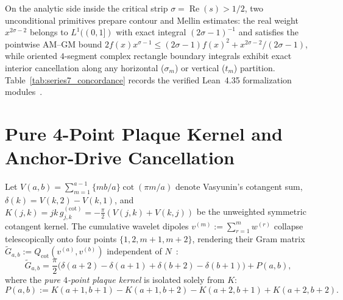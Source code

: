 \documentclass[10pt,a4paper]{article}
\theoremstyle{definition}
\begin{document}
On the analytic side inside the critical strip $\sigma = \operatorname{Re}(s) > 1/2$, two unconditional primitives prepare contour and Mellin estimates: the real weight $x^{2\sigma-2}$ belongs to $L^1((0,1])$ with exact integral $(2\sigma-1)^{-1}$ and satisfies the pointwise AM--GM bound $2 f(x) x^{\sigma-1} \le (2\sigma-1) f(x)^2 + x^{2\sigma-2}/(2\sigma-1)$, while oriented $4$-segment complex rectangle boundary integrals exhibit exact interior cancellation along any horizontal ($\sigma_m$) or vertical ($t_m$) partition. Table~\ref{tab:series7_concordance} records the verified Lean~4.35 formalization modules~\cite{deMouraUllrich2021,mathlibCommunity2020,MunawerRiemannBlueprint2026}.

\section{Pure 4-Point Plaque Kernel and Anchor-Drive Cancellation}\label{sec:plaque}

Let $V(a,b) = \sum_{m=1}^{a-1} \{mb/a\}\cot(\pi m/a)$ denote Vasyunin's cotangent sum, $\delta(k) = V(k,2) - V(k,1)$, and $K(j,k) = jk\, g_{j,k}^{(\mathrm{cot})} = -\tfrac{\pi}{2}(V(j,k)+V(k,j))$ be the unweighted symmetric cotangent kernel. The cumulative wavelet dipoles $v^{(m)} := \sum_{r=1}^m w^{(r)}$ collapse telescopically onto four points $\{1,2,m+1,m+2\}$, rendering their Gram matrix $\widetilde{G}_{a,b} := Q_{\mathrm{cot}}(v^{(a)}, v^{(b)})$ independent of $N$~\cite{MunawerPaperE2026}:
\begin{equation}\label{eq:gram_split}
\widetilde{G}_{a,b} = \frac{\pi}{2}\bigl(\delta(a+2)-\delta(a+1) + \delta(b+2)-\delta(b+1)\bigr) + P(a,b),
\end{equation}
where the \emph{pure $4$-point plaque kernel} is isolated solely from $K$:
\begin{equation}\label{eq:plaque_def}
P(a,b) := K(a+1,b+1) - K(a+1,b+2) - K(a+2,b+1) + K(a+2,b+2).
\end{equation}
\end{document}
